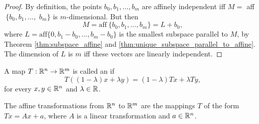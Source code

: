 \documentclass[11pt,a4paper]{article}
\begin{document}
\begin{proof}
    By definition, the points $b_0,b_1,\ldots, b_m$ are affinely independent iff $M = $ aff$\ \{b_0,b_1,\ldots,$ $b_m\}$ is $m$-dimensional. But then
    \begin{equation*}
        M = \text{aff}\ \{b_0,b_1,\ldots, b_m\} = L + b_0, 
    \end{equation*}
    where $L = \text{aff}\{0,b_1-b_0,\ldots, b_m-b_0\}$ is the smallest subspace parallel to $M$, by Theorem \ref{thm:subspace_affine} and \ref{thm:unique_subspace_parallel_to_affine}. The dimension of $L$ is $m$ iff these vectors are linearly independent. 
\end{proof}


\begin{definition}
    A map $T:\mathbb{R}^n\rightarrow \mathbb{R}^m$ is called an  if
    \begin{equation*}
        T((1-\lambda)x + \lambda y) = (1-\lambda) Tx + \lambda Ty,
    \end{equation*}
    for every $x,y\in\mathbb{R}^n$ and $\lambda\in\mathbb{R}$.
\end{definition}

\begin{theorem}\label{thm:affine_linear_relationship}
    The affine transformations from $\mathbb{R}^n$ to $\mathbb{R}^m$ are the mappings $T$ of the form $Tx = Ax+a$, where $A$ is a linear transformation and $a\in \mathbb{R}^n$.
\end{theorem}
\end{document}
